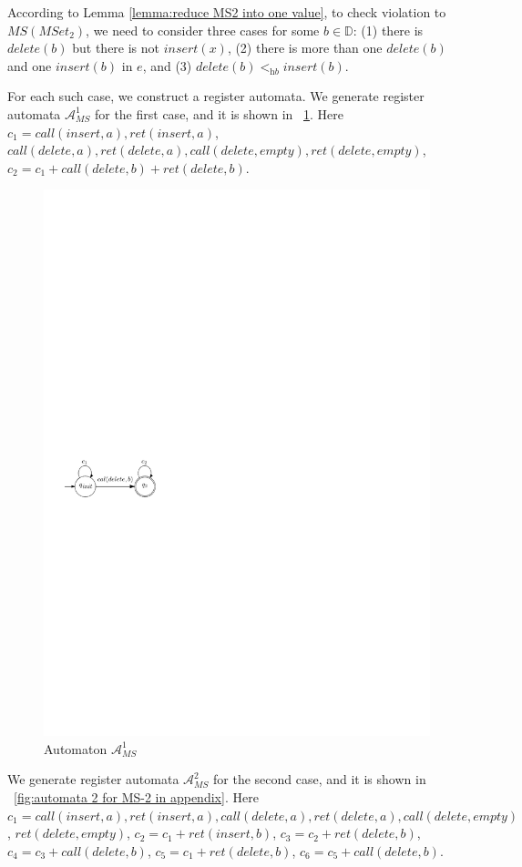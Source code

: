 {According to Lemma \ref{lemma:reduce MS2 into one value}, to check violation to $\textit{MS}(\textit{MSet}_2)$, we need to consider three cases for some $b \in \mathbb{D}$: (1) there is $\textit{delete}(b)$ but there is not $\textit{insert}(x)$, (2) there is more than one $\textit{delete}(b)$ and one $\textit{insert}(b)$ in $e$, and (3) $\textit{delete}(b) <_{\textit{hb}} \textit{insert}(b)$.

For each such case, we construct a register automata. We generate register automata $\mathcal{A}_{\textit{MS}}^1$ for the first case, and it is shown in \figurename~\ref{fig:automata 1 for MS-2 in appendix}. Here $c_1 = \textit{call}(\textit{insert},a),\textit{ret}(\textit{insert},a)$, $\textit{call}(\textit{delete},a),\textit{ret}(\textit{delete},a),
\textit{call}(\textit{delete},\textit{empty}),\textit{ret}(\textit{delete},\textit{empty})$, $c_2 = c_1 + \textit{call}(\textit{delete},b) + \textit{ret}(\textit{delete},b)$.


\begin{figure}[htbp]
  \centering
  \includegraphics[width=0.3 \textwidth]{figures/PIC_AUTO_MS_1.pdf}
  \caption{Automaton $\mathcal{A}_{\textit{MS}}^1$}
  \label{fig:automata 1 for MS-2 in appendix}
\end{figure}


We generate register automata $\mathcal{A}_{\textit{MS}}^2$ for the second case, and it is shown in \figurename~\ref{fig:automata 2 for MS-2 in appendix}. Here $c_1 = \textit{call}(\textit{insert},a),\textit{ret}(\textit{insert},a), \textit{call}(\textit{delete},a),\textit{ret}(\textit{delete},a),\textit{call}(\textit{delete},\textit{empty})$, $\textit{ret}(\textit{delete},\textit{empty})$, $c_2 = c_1 + \textit{ret}(\textit{insert},b)$, $c_3 = c_2 + \textit{ret}(\textit{delete},b)$, $c_4 = c_3 + \textit{call}(\textit{delete},b)$, $c_5 = c_1 + \textit{ret}(\textit{delete},b)$, $c_6 = c_5 + \textit{call}(\textit{delete},b)$.

}
